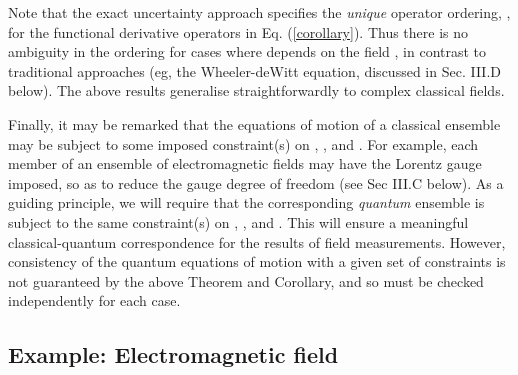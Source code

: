 \documentclass[a4paper,preprint, showpacs, aps, draft]{revtex4}
\begin{document}
{Note that the
exact uncertainty approach specifies the {\it unique} operator ordering,
\coordHE{},
for the functional derivative operators in Eq. (\ref{corollary}).  Thus
there is no ambiguity in the ordering for cases where \coordHE{} depends on
the field \coordHE{}, in contrast to traditional
approaches (eg, the Wheeler-deWitt equation, discussed in Sec.
III.D below).  The above results generalise straightforwardly to complex
classical fields.  

Finally, it may be remarked that the equations of motion of a classical
ensemble may be subject to some imposed constraint(s) on \coordHE{}, \coordHE{}, \coordHE{} and
\coordHE{}.  For example, each
member of an ensemble of electromagnetic fields may have the Lorentz gauge 
imposed, so as to reduce the gauge degree of freedom (see Sec III.C
below). As a guiding principle, we will require that the corresponding
{\it quantum} ensemble is subject to the same constraint(s) on \coordHE{}, \coordHE{}, \coordHE{}
and \coordHE{}.  This will ensure a meaningful classical-quantum
correspondence for the results of field measurements.  However,
consistency of the quantum equations of motion with a given set of
constraints is not guaranteed by the above Theorem and Corollary, and so
must be checked independently for each case.

\subsection{Example: Electromagnetic field}

}
\end{document}
